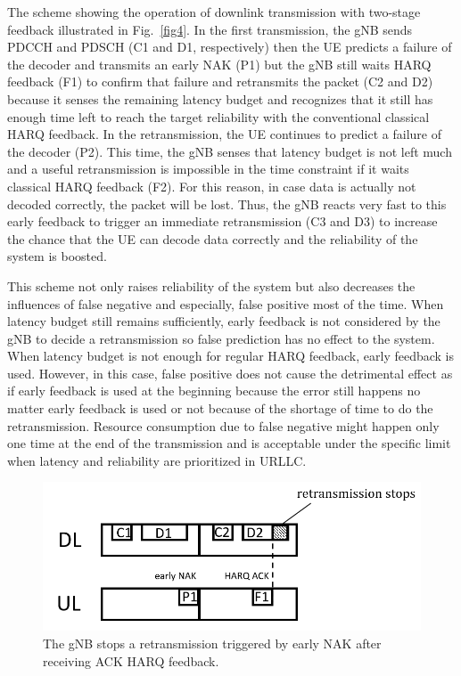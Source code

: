 \documentclass[conference]{IEEEtran}
\begin{document}
The scheme showing the operation of downlink transmission with two-stage feedback illustrated in Fig.~\ref{fig4}. In the first transmission, the gNB sends PDCCH and PDSCH (C1 and D1, respectively) then the UE predicts a failure of the decoder and transmits an early NAK (P1) but the gNB still waits HARQ feedback (F1) to confirm that failure and retransmits the packet (C2 and D2) because it senses the remaining latency budget and recognizes that it still has enough time left to reach the target reliability with the conventional classical HARQ feedback. In the retransmission, the UE continues to predict a failure of the decoder (P2). This time, the gNB senses that latency budget is not left much and a useful retransmission is impossible in the time constraint if it waits classical HARQ feedback (F2). For this reason, in case data is actually not decoded correctly, the packet will be lost. Thus, the gNB reacts very fast to this early feedback to trigger an immediate retransmission (C3 and D3) to increase the chance that the UE can decode data correctly and the reliability of the system is boosted.

This scheme not only raises reliability of the system but also decreases the influences of false negative and especially, false positive most of the time. When latency budget still remains sufficiently, early feedback is not considered by the gNB to decide a retransmission so false prediction has no effect to the system. When latency budget is not enough for regular HARQ feedback, early feedback is used. However, in this case, false positive does not cause the detrimental effect as if early feedback is used at the beginning because the error still happens no matter early feedback is used or not because of the shortage of time to do the retransmission. Resource consumption due to false negative might happen only one time at the end of the transmission and is acceptable under the specific limit when latency and reliability are prioritized in URLLC.

\begin{figure}[htbp]
\centerline{\includegraphics[scale=0.38]{fig5.png}}
\caption{The gNB stops a retransmission triggered by early NAK after receiving ACK HARQ feedback.}
\label{fig5}
\end{figure}
\end{document}
